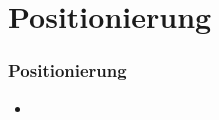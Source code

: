 \section{Positionierung}
\label{sec:positionierung}

\begin{frame}
  \frametitle{Positionierung}

  \begin{itemize}
  \item 
  \end{itemize}
\end{frame}